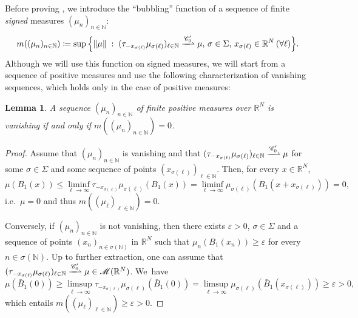 \documentclass[11pt]{article}
\providecommand{\ie}{i.e.\ }
\theoremstyle{plain}
\newtheorem{lemma}[lemma]{Lemma}
\theoremstyle{definition}
\newcommand{\N}{\mathbb{N}}
\newcommand{\R}{\mathbb{R}}
\newcommand{\Cspace}{\mathscr{C}}
\newcommand{\Mspace}{\mathscr{M}}
\newcommand{\eps}{\varepsilon}
\newcommand{\st}{\;:\;}
\DeclarePairedDelimiter{\norm}{\lVert}{\rVert}
\newcommand{\mweakto}{\xrightharpoonup{\Cspace_0'}}
\numberwithin{equation}{section}
\begin{document}
Before proving , we introduce the \enquote{bubbling} function of a sequence of finite \emph{signed} measures \((\mu_n)_{n\in\N}\):\vspace*{-3pt}
\begin{equation}
m((\mu_n)_{n\in\N})\coloneqq\sup\Big\{ \norm{\mu} \st (\tau_{-x_{\sigma(\ell)}}\mu_{\sigma(\ell)})_{\ell\in\N} \mweakto \mu,\, \sigma \in \Sigma,\, x_{\sigma(\ell)} \in \R^N\, (\forall \ell) \Big\}.
\end{equation}
Although we will use this function on signed measures, we will start from a sequence of positive measures and use the following characterization of vanishing sequences, which holds only in the case of positive measures:
\begin{lemma}\label{concentrationProperties}
A sequence \((\mu_n)_{n\in\N}\) of finite positive measures over $\R^N$ is vanishing if and only if \(m((\mu_n)_{n\in\N})=0\).
\end{lemma}
\begin{proof}
Assume that \((\mu_n)_{n\in\N}\) is vanishing and that \((\tau_{-x_{\sigma(\ell)}}\mu_{\sigma(\ell)})_{\ell\in\N} \mweakto \mu\) for some \(\sigma \in \Sigma\) and some sequence of points \((x_{\sigma(\ell)})_{\ell\in\N}\). Then, for every \(x\in\R^N\),\vspace*{-3pt}
\[
\mu(B_1(x))\le\liminf_{\ell\to\infty}\tau_{-x_{\sigma(\ell)}}\mu_{\sigma(\ell)}(B_1(x))=\liminf_{\ell\to\infty}\mu_{\sigma(\ell)}(B_1(x+x_{\sigma(\ell)}))=0,
\]
\ie \(\mu=0\) and thus \(m((\mu_\ell)_{\ell\in\N})=0\).

Conversely, if \((\mu_n)_{n\in\N}\) is not vanishing, then there exists \(\eps>0\), \(\sigma\in\Sigma\) and a sequence of points \((x_n)_{n\in\sigma(\N)}\) in \(\R^N\) such that \(\mu_n(B_1(x_n))\ge\eps\) for every \(n\in\sigma(\N)\). Up to further extraction, one can assume that \((\tau_{-x_{\sigma(\ell)}}\mu_{\sigma(\ell)})_{\ell\in\N} \mweakto\mu\in\Mspace(\R^N)\). We~have\vspace*{-3pt}
\[
\mu(\bar B_1(0))\ge\limsup_{\ell\to\infty}\tau_{-x_{\sigma(\ell)}}\mu_{\sigma(\ell)}(\bar B_1(0))=\limsup_{\ell\to\infty}\mu_{\sigma(\ell)}(\bar B_1(x_{\sigma(\ell)}))\ge\eps>0,
\]
which entails \(m((\mu_\ell)_{\ell\in\N})\ge\eps>0\).
\end{proof}
\end{document}
